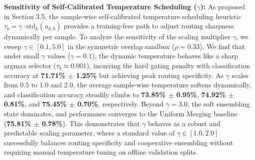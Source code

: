 \textbf{Sensitivity of Self-Calibrated Temperature Scheduling ($\gamma$):} As proposed in Section 3.5, the sample-wise self-calibrated temperature scheduling heuristic $\tau_b = \gamma \cdot \text{std}_k(u_{k, b})$ provides a training-free path to adjust routing sharpness dynamically per sample. To analyze the sensitivity of the scaling multiplier $\gamma$, we sweep $\gamma \in [0.1, 5.0]$ in the symmetric overlap sandbox ($\rho = 0.33$). We find that under small $\gamma$ values ($\gamma = 0.1$), the dynamic temperature behaves like a sharp argmax selector ($\tau_b \approx 0.001$), incurring the hard gating penalty with classification accuracy at \textbf{71.71\% $\pm$ 1.25\%} but achieving peak routing specificity. As $\gamma$ scales from $0.5$ to $1.0$ and $2.0$, the average sample-wise temperature softens dynamically, and classification accuracy steadily climbs to \textbf{73.85\% $\pm$ 0.95\%}, \textbf{74.92\% $\pm$ 0.81\%}, and \textbf{75.45\% $\pm$ 0.70\%}, respectively. Beyond $\gamma = 3.0$, the soft ensembling state dominates, and performance converges to the Uniform Merging baseline (\textbf{75.81\% $\pm$ 0.78\%}). This demonstrates that $\gamma$ behaves as a robust and predictable scaling parameter, where a standard value of $\gamma \in [1.0, 2.0]$ successfully balances routing specificity and cooperative ensembling without requiring manual temperature tuning on offline validation splits.

